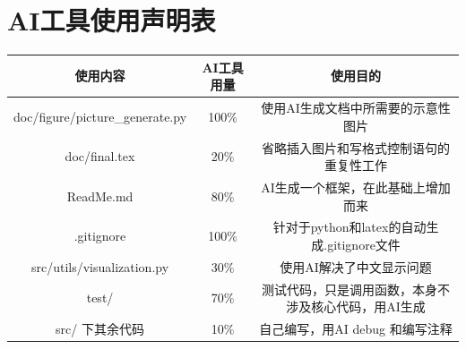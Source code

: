 \documentclass[UTF8]{ctexart}
\begin{document}
\newpage
\appendix
\section{AI工具使用声明表}
\begin{table}[H]
    \centering
    \begin{tabular}{c|c|c}
        \hline
        使用内容 & AI工具用量 & 使用目的 \\ 
        \hline
        doc/figure/picture\_generate.py & 100\% & 使用AI生成文档中所需要的示意性图片 \\
        doc/final.tex & 20\% & 省略插入图片和写格式控制语句的重复性工作 \\ 
        ReadMe.md & 80\% & AI生成一个框架，在此基础上增加而来 \\
        .gitignore & 100\% & 针对于python和latex的自动生成.gitignore文件  \\
        src/utils/visualization.py & 30\% & 使用AI解决了中文显示问题 \\
        test/ & 70\% & 测试代码，只是调用函数，本身不涉及核心代码，用AI生成 \\
        src/ 下其余代码 & 10\% & 自己编写，用AI debug 和编写注释 \\
        \hline
    \end{tabular}
    \label{tab:AI_tools}
\end{table}


\newpage
\section{}
\end{document}
